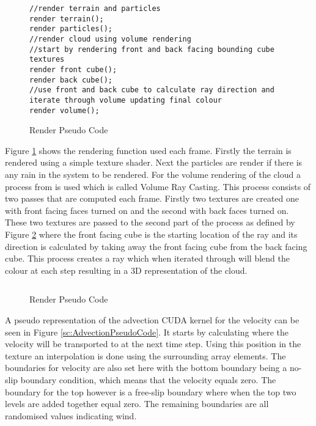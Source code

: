 \begin{figure}[h]
\centering
\begin{lstlisting}
//render terrain and particles
render terrain();
render particles();
//render cloud using volume rendering 
//start by rendering front and back facing bounding cube textures
render front cube();
render back cube(); 
//use front and back cube to calculate ray direction and iterate through volume updating final colour
render volume();
\end{lstlisting}
\caption{Render Pseudo Code}
\label{sc:RenderingPseudoCode}
\end{figure}

Figure \ref{sc:RenderingPseudoCode} shows the rendering function used each frame.
Firstly the terrain is rendered using a simple texture shader.
Next the particles are render if there is any rain in the system to be rendered.
For the volume rendering of the cloud a process from \citet{KHayward09} is used which is called Volume Ray Casting.
This process consists of two passes that are computed each frame.
Firstly two textures are created one with front facing faces turned on and the second with back faces turned on.
These two textures are passed to the second part of the process as defined by Figure \ref{sc:Volume_rendering} where the front facing cube is the starting location of the ray and its direction is calculated by taking away the front facing cube from the back facing cube.
This process creates a ray which when iterated through will blend the colour at each step resulting in a 3D representation of the cloud. 

\begin{figure}[h]
\centering
\begin{lstlisting}

\end{lstlisting}
\caption{Render Pseudo Code}
\label{sc:Volume_rendering}
\end{figure}

A pseudo representation of the advection CUDA kernel for the velocity can be seen in Figure \ref{sc:AdvectionPseudoCode}.
It starts by calculating where the velocity will be transported to at the next time step.
Using this position in the texture an interpolation is done using the surrounding array elements.
The boundaries for velocity are also set here with the bottom boundary being a no-slip boundary condition, which means that the velocity equals zero.
The boundary for the top however is a free-slip boundary where when the top two levels are added together equal zero.
The remaining boundaries are all randomised values indicating wind. 

